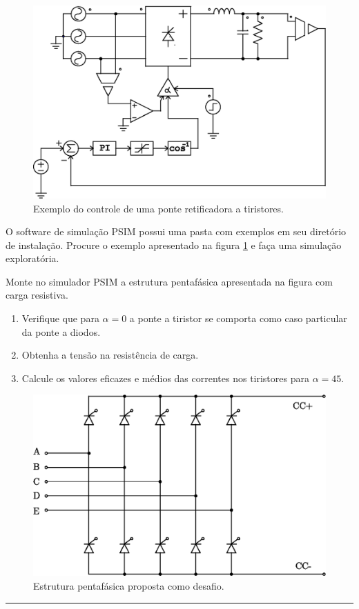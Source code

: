 \documentclass[11pt,paper=a4,answers]{exam}
\begin{document}
\begin{questions}
			\droppoints
			
						
			\question[07]
			\label{Q:ExPSIM}
			
			
	\begin{figure}[!h]
\centering
\includegraphics[width=0.7\linewidth]{figuras/ExPSIM}
\caption{Exemplo do controle de uma ponte retificadora a tiristores.}
\label{fig:ExPSIM}
\end{figure}
		
O software de simulação PSIM possui uma pasta com exemplos em seu diretório de instalação. Procure o exemplo apresentado na figura \ref{fig:ExPSIM}	e faça uma simulação exploratória.		
			
			
\droppoints
			
			
			
			
			
			
			
			\question[8]
			\label{Q:Desafio}
	Monte no simulador PSIM a estrutura pentafásica apresentada na figura com carga resistiva.
	\begin{enumerate}
		\item Verifique que para $\alpha = 0$ a ponte a tiristor se comporta como caso particular da ponte a diodos.
		\item Obtenha a tensão na resistência de carga.
		\item Calcule os valores eficazes e médios das correntes nos tiristores para $\alpha=45$.
	\end{enumerate}
	
	\begin{figure}[!h]
		\centering
		\includegraphics[width=0.7\linewidth]{figuras/TiristorPentafase}
		\caption{Estrutura pentafásica proposta como desafio.}
		\label{fig:TiristorPentafase}
	\end{figure}
			

			
			
		
			
	
			
			

		\end{questions}
		\begin{center}
			\rule{.5\textwidth}{1pt}
		\end{center}
	
\end{document}
